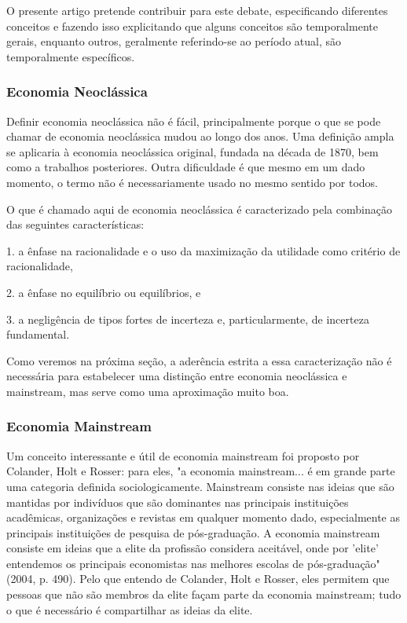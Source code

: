 \documentclass[a4paper,12pt]{article}[abntex2]
\begin{document}
O presente artigo pretende contribuir para este debate, especificando diferentes conceitos e fazendo isso explicitando que alguns conceitos são temporalmente gerais, enquanto outros, geralmente referindo-se ao período atual, são temporalmente específicos.

\subsubsection{\textbf{Economia Neoclássica}}

Definir economia neoclássica não é fácil, principalmente porque o que se pode chamar de economia neoclássica mudou ao longo dos anos. Uma definição ampla se aplicaria à economia neoclássica original, fundada na década de 1870, bem como a trabalhos posteriores. Outra dificuldade é que mesmo em um dado momento, o termo não é necessariamente usado no mesmo sentido por todos.

O que é chamado aqui de economia neoclássica é caracterizado pela combinação das seguintes características:

1. a ênfase na racionalidade e o uso da maximização da utilidade como critério de racionalidade,

2. a ênfase no equilíbrio ou equilíbrios, e

3. a negligência de tipos fortes de incerteza e, particularmente, de incerteza fundamental.

Como veremos na próxima seção, a aderência estrita a essa caracterização não é necessária para estabelecer uma distinção entre economia neoclássica e mainstream, mas serve como uma aproximação muito boa.

\subsubsection{\textbf{Economia Mainstream}}

Um conceito interessante e útil de economia mainstream foi proposto por Colander, Holt e Rosser: para eles, "a economia mainstream... é em grande parte uma categoria definida sociologicamente. Mainstream consiste nas ideias que são mantidas por indivíduos que são dominantes nas principais instituições acadêmicas, organizações e revistas em qualquer momento dado, especialmente as principais instituições de pesquisa de pós-graduação. A economia mainstream consiste em ideias que a elite da profissão considera aceitável, onde por 'elite' entendemos os principais economistas nas melhores escolas de pós-graduação" (2004, p. 490). Pelo que entendo de Colander, Holt e Rosser, eles permitem que pessoas que não são membros da elite façam parte da economia mainstream; tudo o que é necessário é compartilhar as ideias da elite.
\end{document}
